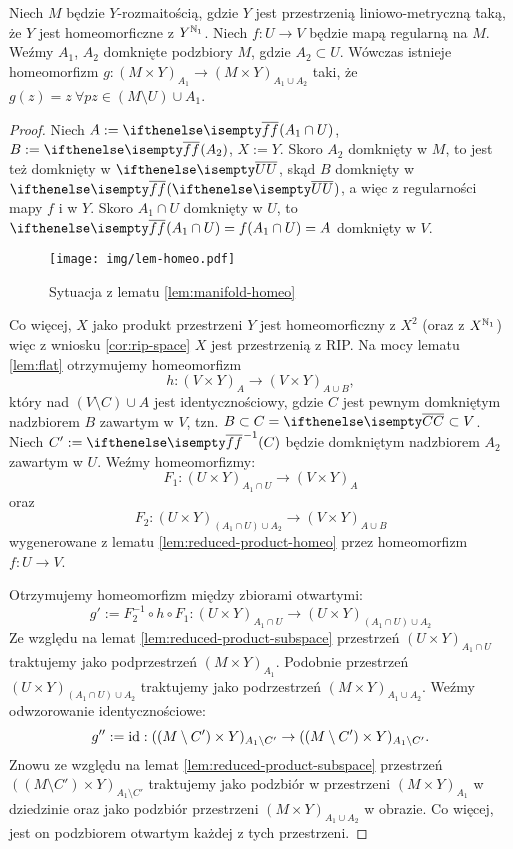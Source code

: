 \begin{lem} \label{lem:manifold-homeo}
  Niech $M$ będzie $Y$-rozmaitością, gdzie $Y$ jest przestrzenią liniowo-metryczną taką, że $Y$ jest homeomorficzne z $Y^{\mathbb{N}_1}$. Niech $f: U \to V$ będzie mapą regularną na $M$. Weźmy $A_1$, $A_2$ domknięte podzbiory $M$, gdzie $A_2 \subset U$. Wówczas istnieje homeomorfizm $g: (M\times Y)_{A_1} \to (M\times Y)_{A_1 \cup A_2}$ taki, że $g(z) = z\ \forall pz \in (M\setminus U) \cup A_1$.
  
  \begin{proof}
    Niech $A := \cl{f}(A_1 \cap U)$, $B := \cl{f}(A_2)$, $X := Y$. Skoro $A_2$ domknięty w $M$, to jest też domknięty w $\cl U$, skąd $B$ domknięty w $\cl{f}(\cl U)$, a więc z regularności mapy $f$ i w $Y$. Skoro $A_1 \cap U$ domknięty w $U$, to $\cl{f}(A_1 \cap U) = f(A_1 \cap U) = A$ domknięty w $V$.
    
    \begin{figure}[h!]
      \centering
      \texttt{[image: img/lem-homeo.pdf]}
      \caption{Sytuacja z lematu \ref{lem:manifold-homeo}}
    \end{figure}
    
    Co więcej, $X$ jako produkt przestrzeni $Y$ jest homeomorficzny z $X^2$ (oraz z $X^{\mathbb{N}_1}$) więc z wniosku \ref{cor:rip-space} $X$ jest przestrzenią z RIP. Na mocy lematu \ref{lem:flat} otrzymujemy homeomorfizm
    \[
      h: (V\times Y)_{A} \to (V\times Y)_{A\cup B},
    \]
    który nad $(V\setminus C)\cup A$ jest identycznościowy, gdzie $C$ jest pewnym domkniętym nadzbiorem $B$ zawartym w $V$, tzn. $B \subset C = \cl C \subset V$. Niech $C' := \cl{f}^{-1}(C)$ będzie domkniętym nadzbiorem $A_2$ zawartym w $U$.
    Weźmy homeomorfizmy:
    \[
      F_1: (U\times Y)_{A_1 \cap U} \to (V\times Y)_A
    \]
    oraz
    \[
      F_2: (U\times Y)_{(A_1 \cap U)\cup A_2} \to (V\times Y)_{A\cup B}
    \]
    wygenerowane z lematu \ref{lem:reduced-product-homeo} przez homeomorfizm $f: U\to V$.

    Otrzymujemy homeomorfizm między zbiorami otwartymi:
    \[
      g' := F_2^{-1} \circ h \circ F_1: (U\times Y)_{A_1 \cap U} \to (U\times Y)_{(A_1\cap U) \cup A_2}
    \]
    Ze względu na lemat \ref{lem:reduced-product-subspace} przestrzeń $(U\times Y)_{A_1 \cap U}$ traktujemy jako podprzestrzeń $(M\times Y)_{A_1}$. Podobnie przestrzeń $(U\times Y)_{(A_1\cap U)\cup A_2}$ traktujemy jako podrzestrzeń $(M\times Y)_{A_1\cup A_2}$.
    Weźmy odwzorowanie identycznościowe:
    \[
      g'' := \operatorname{id}: ((M\setminus C')\times Y)_{A_1\setminus C'} \to ((M\setminus C')\times Y)_{A_1\setminus C'}.
    \]
    Znowu ze względu na lemat \ref{lem:reduced-product-subspace} przestrzeń $((M\setminus C')\times Y)_{A_1\setminus C'}$ traktujemy jako podzbiór w przestrzeni $(M\times Y)_{A_1}$ w dziedzinie oraz jako podzbiór przestrzeni $(M\times Y)_{A_1\cup A_2}$ w obrazie. Co więcej, jest on podzbiorem otwartym każdej z tych przestrzeni.
    

\end{proof}
\end{lem}
